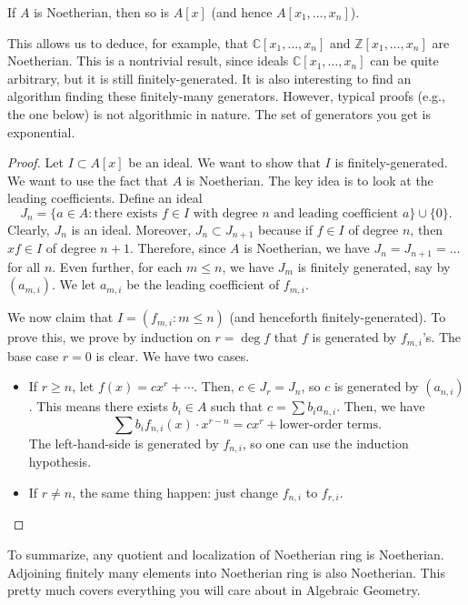 \begin{theorem}
    \label{thm:hilbert_basis}
    If $A$ is Noetherian, then so is $A[x]$
    (and hence $A[x_1,\dots,x_n]$).
\end{theorem}
This allows us to deduce, for example, that
$\mathbb C[x_1,\dots,x_n]$ and
$\mathbb Z[x_1,\dots,x_n]$ are Noetherian.
This is a nontrivial result,
since ideals $\mathbb C[x_1,\dots,x_n]$
can be quite arbitrary, but it is still finitely-generated.
It is also interesting to find an algorithm
finding these finitely-many generators.
However, typical proofs (e.g., the one below)
is not algorithmic in nature.
The set of generators you get is exponential.
\begin{proof}
    Let $I\subset A[x]$ be an ideal.
    We want to show that $I$ is finitely-generated.
    We want to use the fact that $A$ is Noetherian.
    The key idea is to look at the leading coefficients.
    Define an ideal
    $$J_n = \{a\in A : \text{there exists } f\in I
	\text{ with degree } n\text{ and leading 
    coefficient } a\} \cup \{0\}.$$
    Clearly, $J_n$ is an ideal.
    Moreover, $J_n\subset J_{n+1}$ because if $f\in I$
    of degree $n$, then $xf\in I$ of degree $n+1$.
    Therefore, since $A$ is Noetherian,
    we have $J_n=J_{n+1}=\dots$ for all $n$.
    Even further, for each $m\leq n$,
    we have $J_m$ is finitely generated, say by
    $(a_{m,i})$. We let $a_{m,i}$ be
    the leading coefficient of $f_{m,i}$.

    We now claim that $I = (f_{m,i} : m\leq n)$
    (and henceforth finitely-generated).
    To prove this, we prove by induction on $r=\deg f$
    that $f$ is generated by $f_{m,i}$'s.
    The base case $r=0$ is clear.
    We have two cases.
    \begin{itemize}
    \item If $r\geq n$, let $f(x) = cx^r + \cdots$.
	Then, $c\in J_r = J_n$, so $c$ is generated
	by $(a_{n,i})$. This means there exists
	$b_i\in A$ such that $c = \sum b_i a_{n,i}$.
	Then, we have
	$$\sum b_i f_{n,i}(x)\cdot x^{r-n} = cx^r
	+ \text{lower-order terms}.$$
	The left-hand-side is generated by $f_{n,i}$,
	so one can use the induction hypothesis.
    \item If $r\neq n$, the same thing happen:
	just change $f_{n,i}$ to $f_{r,i}$. \qedhere
    \end{itemize}
\end{proof}
To summarize, any quotient and localization
of Noetherian ring is Noetherian.
Adjoining finitely many elements into
Noetherian ring is also Noetherian.
This pretty much covers everything you will care about
in Algebraic Geometry.

